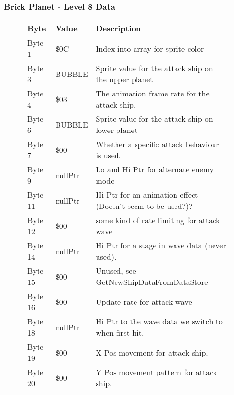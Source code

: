 \clearpage
\subsubsection{Brick Planet - Level 8 Data}

\begin{figure}[H]
  {
  \setlength{\tabcolsep}{3.0pt}
  \setlength\cmidrulewidth{\heavyrulewidth} %
  \begin{adjustbox}{width=12cm}

\begin{tabular}{lll}
\toprule
 Byte    & Value            & Description                                                        \\
\midrule
 Byte 1  & \$0C              & Index into array for sprite color                                  \\
 Byte 3  & BUBBLE           & Sprite value for the attack ship on the upper planet               \\
 Byte 4  & \$03              & The animation frame rate for the attack ship.                      \\
 Byte 6  & BUBBLE           & Sprite value for the attack ship on lower planet                   \\
 Byte 7  & \$00              & Whether a specific attack behaviour is used.                       \\
 Byte 9  & nullPtr          & Lo and Hi Ptr for alternate enemy mode                             \\
 Byte 11 & nullPtr          & Hi Ptr for an animation effect (Doesn't seem to be used?)?         \\
 Byte 12 & \$00              & some kind of rate limiting for attack wave                         \\
 Byte 14 & nullPtr          & Hi Ptr for a stage in wave data (never used).                      \\
 Byte 15 & \$00              & Unused, see GetNewShipDataFromDataStore                            \\
 Byte 16 & \$00              & Update rate for attack wave                                        \\
 Byte 18 & nullPtr          & Hi Ptr to the wave data we switch to when first hit.               \\
 Byte 19 & \$00              & X Pos movement for attack ship.                                    \\
 Byte 20 & \$00              & Y Pos movement pattern for attack ship.                            \\

\end{tabular}
\end{adjustbox}}
\end{figure}
